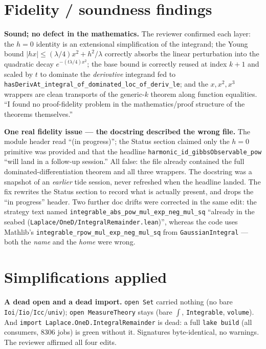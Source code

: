 \documentclass[11pt]{article}
\begin{document}
\section{Fidelity / soundness findings}
\textbf{Sound; no defect in the mathematics.} The reviewer confirmed each layer: the $h=0$
identity is an extensional simplification of the integrand; the Young bound
$|hx|\le(\lambda/4)x^2+h^2/\lambda$ correctly absorbs the linear perturbation into the quadratic
decay $e^{-(t\lambda/4)x^2}$; the base bound is correctly reused at index $k+1$ and scaled by $t$ to
dominate the \emph{derivative} integrand fed to
\texttt{hasDerivAt\_integral\_of\_dominated\_loc\_of\_deriv\_le}; and the $x,x^2,x^3$ wrappers are
clean transports of the generic-$k$ theorem along function equalities. ``I found no proof-fidelity
problem in the mathematics/proof structure of the theorems themselves.''

\textbf{One real fidelity issue --- the docstring described the wrong file.} The module header read
``(in progress)''; the Status section claimed only the $h=0$ primitive was provided and that the
headline \texttt{harmonic\_id\_gibbsObservable\_pow} ``will land in a follow-up session.'' All false:
the file already contained the full dominated-differentiation theorem and all three wrappers. The
docstring was a snapshot of an \emph{earlier} tide session, never refreshed when the headline landed.
The fix rewrites the Status section to record what is actually present, and drops the ``in progress''
header. Two further doc drifts were corrected in the same edit: the strategy text named
\texttt{integrable\_abs\_pow\_mul\_exp\_neg\_mul\_sq} ``already in the seabed
(\texttt{Laplace/OneD/IntegralRemainder.lean})'', whereas the code uses Mathlib's
\texttt{integrable\_rpow\_mul\_exp\_neg\_mul\_sq} from \texttt{GaussianIntegral} --- both the
\emph{name} and the \emph{home} were wrong.

\section{Simplifications applied}
\textbf{A dead open and a dead import.} \texttt{open Set} carried nothing (no bare
\texttt{Ioi}/\texttt{Iio}/\texttt{Icc}/\texttt{univ}); \texttt{open MeasureTheory} stays (bare $\int$,
\texttt{Integrable}, \texttt{volume}). And \texttt{import Laplace.OneD.IntegralRemainder} is dead: a
full \texttt{lake build} (all consumers, 8306 jobs) is green without it. Signatures byte-identical,
no warnings. The reviewer affirmed all four edits.
\end{document}
